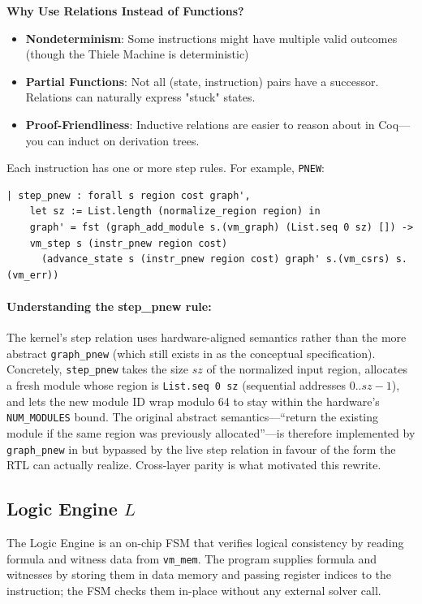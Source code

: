 \textbf{Why Use Relations Instead of Functions?}
\begin{itemize}
    \item \textbf{Nondeterminism}: Some instructions might have multiple valid outcomes (though the Thiele Machine is deterministic)
    \item \textbf{Partial Functions}: Not all (state, instruction) pairs have a successor. Relations can naturally express "stuck" states.
    \item \textbf{Proof-Friendliness}: Inductive relations are easier to reason about in Coq—you can induct on derivation trees.
\end{itemize}

Each instruction has one or more step rules. For example, \texttt{PNEW}:
\begin{lstlisting}
| step_pnew : forall s region cost graph',
    let sz := List.length (normalize_region region) in
    graph' = fst (graph_add_module s.(vm_graph) (List.seq 0 sz) []) ->
    vm_step s (instr_pnew region cost)
      (advance_state s (instr_pnew region cost) graph' s.(vm_csrs) s.(vm_err))
\end{lstlisting}

\paragraph{Understanding the step\_pnew rule:} The kernel's step relation uses hardware-aligned semantics rather than the more abstract \texttt{graph\_pnew} (which still exists in  as the conceptual specification). Concretely, \texttt{step\_pnew} takes the size $sz$ of the normalized input region, allocates a fresh module whose region is \texttt{List.seq 0 sz} (sequential addresses 0..$sz-1$), and lets the new module ID wrap modulo 64 to stay within the hardware's \texttt{NUM\_MODULES} bound. The original abstract semantics---``return the existing module if the same region was previously allocated''---is therefore implemented by \texttt{graph\_pnew} in  but bypassed by the live step relation in favour of the form the RTL can actually realize. Cross-layer parity is what motivated this rewrite.

\subsection{Logic Engine $L$}

The Logic Engine is an on-chip FSM that verifies logical consistency by reading formula and witness data from \texttt{vm\_mem}. The program supplies formula and witnesses by storing them in data memory and passing register indices to the instruction; the FSM checks them in-place without any external solver call.

